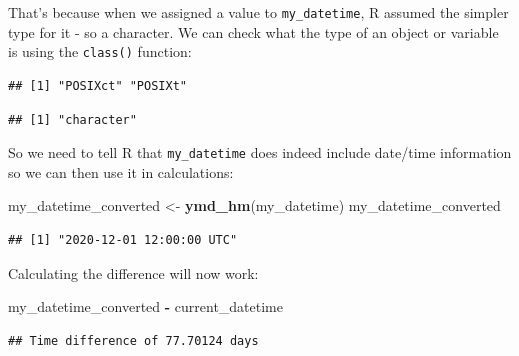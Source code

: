 \documentclass[
  12pt,
  krantz2]{krantz}
\makeatletter
\newenvironment{Shaded}{\begin{snugshade}}{\end{snugshade}}
\newcommand{\KeywordTok}[1]{\textcolor[rgb]{0.13,0.29,0.53}{\textbf{#1}}}
\newcommand{\NormalTok}[1]{#1}
\newcommand{\OperatorTok}[1]{\textcolor[rgb]{0.81,0.36,0.00}{\textbf{#1}}}
\newcommand{\StringTok}[1]{\textcolor[rgb]{0.31,0.60,0.02}{#1}}
\newenvironment{kframe}{%
\medskip{}
\setlength{\fboxsep}{.8em}
 \def\at@end@of@kframe{}%
 \ifinner\ifhmode%
  \def\at@end@of@kframe{\end{minipage}}%
  \begin{minipage}{\columnwidth}%
 \fi\fi%
 \def\FrameCommand##1{\hskip\@totalleftmargin \hskip-\fboxsep
 \colorbox{shadecolor}{##1}\hskip-\fboxsep
     \hskip-\linewidth \hskip-\@totalleftmargin \hskip\columnwidth}%
 \MakeFramed {\advance\hsize-\width
   \@totalleftmargin\z@ \linewidth\hsize
   \@setminipage}}%
 {\par\unskip\endMakeFramed%
 \at@end@of@kframe}
\renewenvironment{Shaded}{\begin{kframe}}{\end{kframe}}
\makeatother
\begin{document}
That's because when we assigned a value to \texttt{my\_datetime}, R assumed the simpler type for it - so a character.
We can check what the type of an object or variable is using the \texttt{class()} function:

\begin{Shaded}
\end{Shaded}

\begin{verbatim}
## [1] "POSIXct" "POSIXt"
\end{verbatim}

\begin{Shaded}
\end{Shaded}

\begin{verbatim}
## [1] "character"
\end{verbatim}

So we need to tell R that \texttt{my\_datetime} does indeed include date/time information so we can then use it in calculations:

\begin{Shaded}
\begin{Highlighting}[]
\NormalTok{my_datetime_converted <-}\StringTok{ }\KeywordTok{ymd_hm}\NormalTok{(my_datetime)}
\NormalTok{my_datetime_converted}
\end{Highlighting}
\end{Shaded}

\begin{verbatim}
## [1] "2020-12-01 12:00:00 UTC"
\end{verbatim}

Calculating the difference will now work:

\begin{Shaded}
\begin{Highlighting}[]
\NormalTok{my_datetime_converted }\OperatorTok{-}\StringTok{ }\NormalTok{current_datetime}
\end{Highlighting}
\end{Shaded}

\begin{verbatim}
## Time difference of 77.70124 days
\end{verbatim}
\end{document}
